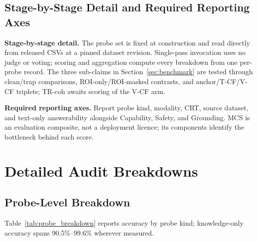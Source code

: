 \documentclass{article}
\begin{document}
\subsection{Stage-by-Stage Detail and Required Reporting Axes}

\textbf{Stage-by-stage detail.} The probe set is fixed at construction and read directly from released CSVs at a pinned dataset revision. Single-pass invocation uses no judge or voting; scoring and aggregation compute every breakdown from one per-probe record. The three sub-claims in Section~\ref{sec:benchmark} are tested through clean/trap comparisons, ROI-only/ROI-masked contrasts, and anchor/T-CF/V-CF triplets; TR-coh awaits scoring of the V-CF arm.

\textbf{Required reporting axes.} Report probe kind, modality, CRT, source dataset, and text-only answerability alongside Capability, Safety, and Grounding. MCS is an evaluation composite, not a deployment licence; its components identify the bottleneck behind each score.

\section{Detailed Audit Breakdowns}
\label{app:audit_breakdowns}


\subsection{Probe-Level Breakdown}

Table~\ref{tab:probe_breakdown} reports accuracy by probe kind; knowledge-only accuracy spans 90.5\%--99.6\% wherever measured.
\end{document}
